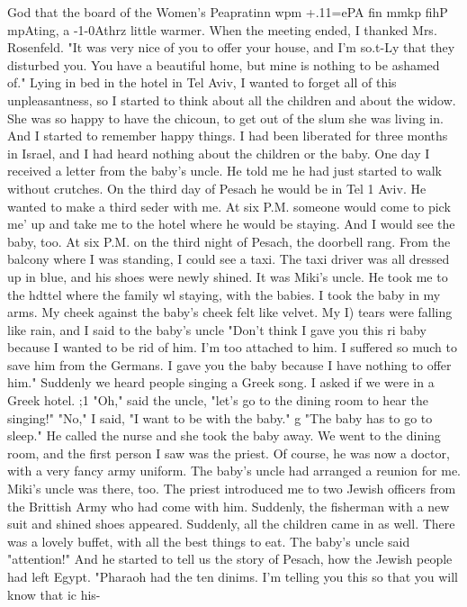 God that the board of the Women's Peapratinn wpm +.11=ePA fin mmkp fihP mpAting, a -1-0Athrz 
little warmer.
When the meeting ended, I thanked Mrs.
Rosenfeld.
"It was very nice of you to offer 
your house, and I'm so.t-Ly that they disturbed you.
You have a beautiful home, but mine 
is nothing to be ashamed of."
Lying in bed in the hotel in Tel Aviv, I wanted to forget all of this unpleasantness, 
so I started to think about all the children and about the widow.
She was so happy to 
have the chicoun, to get out of the slum she was living in.
And I started to remember 
happy things.
I had been liberated for three months in Israel, and I had heard nothing about the 
children or the baby.
One day I received a letter from the baby's uncle.
He told me he 
had just started to walk without crutches.
On the third day of Pesach he would be in Tel 1 
Aviv.
He wanted to make a third seder with me.
At six P.M.
someone would come to pick me' 
up and take me to the hotel where he would be staying.
And I would see the baby, too.
At six P.M.
on the third night of Pesach, the doorbell rang.
From the balcony where 
I was standing, I could see a taxi.
The taxi driver was all dressed up in blue, and his 
shoes were newly shined.
It was Miki's uncle.
He took me to the hdttel where the family wl 
staying, with the babies.
I took the baby in my arms.
My cheek against the baby's cheek felt like velvet.
My 
I) 
tears were falling like rain, and I said to the baby's uncle "Don't think I gave you this ri 
baby because I wanted to be rid of him.
I'm too attached to him.
I suffered so much to 
save him from the Germans.
I gave you the baby because I have nothing to offer him."
Suddenly we heard people singing a Greek song.
I asked if we were in a Greek hotel.
;1 
"Oh," said the uncle, "let's go to the dining room to hear the singing!"
"No," I said, 
"I want to be with the baby."
g "The baby has to go to sleep."
He called the nurse and 
she took the baby away.
We went to the dining room, and the first person I saw was the priest.
Of course, he 
was now a doctor, with a very fancy army uniform.
The baby's uncle had arranged a reunion 
for me.
Miki's uncle was there, too.
The priest introduced me to two Jewish officers 
from the Brittish Army who had come with him.
Suddenly, the fisherman with a new suit 
and shined shoes appeared.
Suddenly, all the children came in as well.
There was a lovely buffet, with all the best things to eat.
The baby's uncle said 
"attention!"
And he started to tell us the story of Pesach, how the Jewish people had 
left Egypt.
"Pharaoh had the ten dinims.
I'm telling you this so that you will know that ic his-
